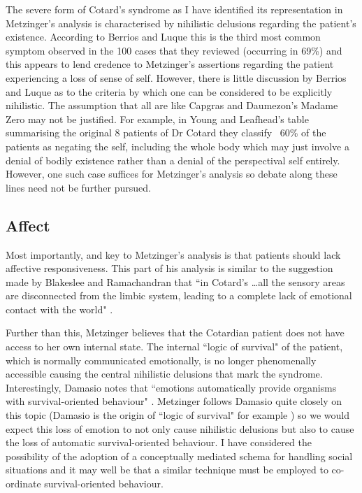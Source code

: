The severe form of Cotard's syndrome as I have identified its representation in Metzinger's analysis is characterised by nihilistic delusions regarding the patient's existence. According to Berrios and Luque \cite{berrios1995b} this is the third most common symptom observed in the 100 cases that they reviewed (occurring in 69\%) and this appears to lend credence to Metzinger's assertions regarding the patient experiencing a loss of sense of self. However, there is little discussion by Berrios and Luque as to the criteria by which one can be considered to be explicitly nihilistic. The assumption that all are like Capgras and Daumezon's \cite{capras1936} Madame Zero may not be justified. For example, in Young and Leafhead's table summarising the original 8 patients of Dr Cotard they classify ~60\% of the patients as negating the self, including the whole body \cite[p. 152]{young1995} which may just involve a denial of bodily existence rather than a denial of the perspectival self entirely. However, one such case suffices for Metzinger's analysis so debate along these lines need not be further pursued.

\subsection{Affect}

Most importantly, and key to Metzinger's analysis is that patients should lack affective responsiveness. This part of his analysis is similar to the suggestion made by Blakeslee and Ramachandran that ``in Cotard's \ldots all the sensory areas are disconnected from the limbic system, leading to a complete lack of emotional contact with the world" \cite[p. 167]{blakeslee1998}.

Further than this, Metzinger believes that the Cotardian patient does not have access to her own internal state. The internal ``logic of survival" of the patient, which is normally communicated emotionally, is no longer phenomenally accessible causing the central nihilistic delusions that mark the syndrome. Interestingly, Damasio notes that ``emotions automatically provide organisms with survival-oriented behaviour" \cite[p. 56]{damasio2000}. Metzinger follows Damasio quite closely on this topic (Damasio is the origin of ``logic of survival" for example \cite[p. 198]{metzinger2003}) so we would expect this loss of emotion to not only cause nihilistic delusions but also to cause the loss of automatic survival-oriented behaviour. I have considered the possibility of the adoption of a conceptually mediated schema for handling social situations and it may well be that a similar technique must be employed to co-ordinate survival-oriented behaviour.

